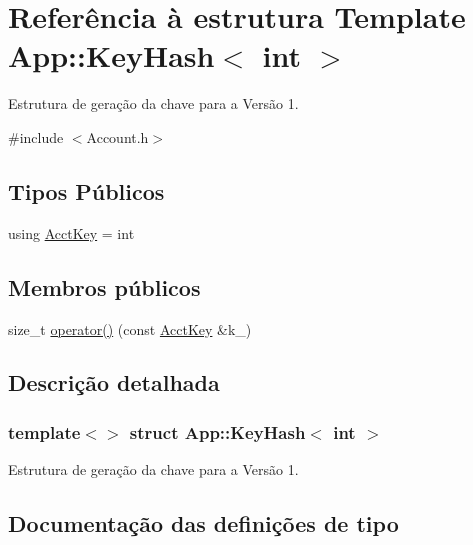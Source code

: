 \hypertarget{structApp_1_1KeyHash_3_01int_01_4}{}\section{Referência à estrutura Template App\+:\+:Key\+Hash$<$ int $>$}
\label{structApp_1_1KeyHash_3_01int_01_4}


Estrutura de geração da chave para a Versão 1.  




{\ttfamily \#include $<$Account.\+h$>$}

\subsection*{Tipos Públicos}
\begin{DoxyCompactItemize}
\item 
using \hyperlink{structApp_1_1KeyHash_3_01int_01_4_a337642864b44481d75807a3d2238e9ab}{Acct\+Key} = int
\end{DoxyCompactItemize}
\subsection*{Membros públicos}
\begin{DoxyCompactItemize}
\item 
size\+\_\+t \hyperlink{structApp_1_1KeyHash_3_01int_01_4_a5661fe92b7971bad40c9dae1cf550b7c}{operator()} (const \hyperlink{structApp_1_1KeyHash_3_01int_01_4_a337642864b44481d75807a3d2238e9ab}{Acct\+Key} \&k\+\_\+)
\end{DoxyCompactItemize}


\subsection{Descrição detalhada}
\subsubsection*{template$<$$>$\newline
struct App\+::\+Key\+Hash$<$ int $>$}

Estrutura de geração da chave para a Versão 1. 

\subsection{Documentação das definições de tipo}
\mbox{\label{structApp_1_1KeyHash_3_01int_01_4_a337642864b44481d75807a3d2238e9ab}} 
